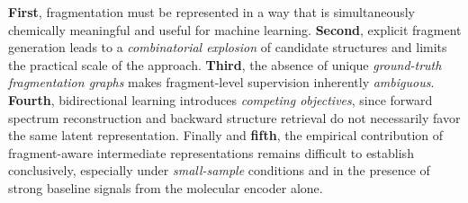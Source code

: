\textbf{First}, fragmentation must be represented in a way that is simultaneously chemically meaningful and useful for machine learning. 
\textbf{Second}, explicit fragment generation leads to a \emph{combinatorial explosion} of candidate structures and limits the practical scale of the approach. 
\textbf{Third}, the absence of unique \emph{ground-truth fragmentation graphs} makes fragment-level supervision inherently \emph{ambiguous}.
\textbf{Fourth}, bidirectional learning introduces \emph{competing objectives}, since forward spectrum reconstruction and backward structure retrieval do not necessarily favor the same latent representation. 
Finally and \textbf{fifth}, the empirical contribution of fragment-aware intermediate representations remains difficult to establish conclusively, especially under \emph{small-sample} conditions and in the presence of strong baseline signals from the molecular encoder alone.


